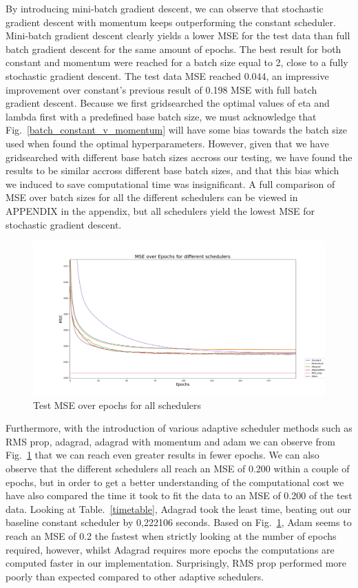 \documentclass[onecolumn,10pt,cleanfoot]{asme2ej}
\begin{document}
By introducing mini-batch gradient descent, we can observe that stochastic gradient descent with momentum keeps outperforming the constant scheduler. Mini-batch gradient descent clearly yields a lower MSE for the test data than full batch gradient descent for the same amount of epochs. The best result for both constant and momentum were reached for a batch size equal to 2, close to a fully stochastic gradient descent. The test data MSE reached 0.044, an impressive improvement over constant's previous result of 0.198 MSE with full batch gradient descent. Because we first gridsearched the optimal values of eta and lambda first with a predefined base batch size, we must acknowledge that Fig.~\ref{batch_constant_v_momentum} will have some bias towards the batch size used when found the optimal hyperparameters. However, given that we have gridsearched with different base batch sizes accross our testing, we have found the results to be similar accross different base batch sizes, and that this bias which we induced to save computational time was insignificant. A full comparison of MSE over batch sizes for all the different schedulers can be viewed in APPENDIX in the appendix, but all schedulers yield the lowest MSE for stochastic gradient descent.

\begin{figure}[h]
\centerline{\includegraphics[width=5in]{figure/200e_schedulers.png}}
\caption{Test MSE over epochs for all schedulers}
\label{figall}
\end{figure}

Furthermore, with the introduction of various adaptive scheduler methods such as RMS prop, adagrad, adagrad with momentum and adam we can observe from Fig.~\ref{figall} that we can reach even greater results in fewer epochs. We can also observe that the different schedulers all reach an MSE of 0.200 within a couple of epochs, but in order to get a better understanding of the computational cost we have also compared the time it took to fit the data to an MSE of 0.200 of the test data. Looking at Table.~\ref{timetable}, Adagrad took the least time, beating out our baseline constant scheduler by 0,222106 seconds. Based on Fig.~\ref{figall}, Adam seems to reach an MSE of 0.2 the fastest when strictly looking at the number of epochs required, however, whilst Adagrad requires more epochs the computations are computed faster in our implementation. Surprisingly, RMS prop performed more poorly than expected compared to other adaptive schedulers.
\end{document}
